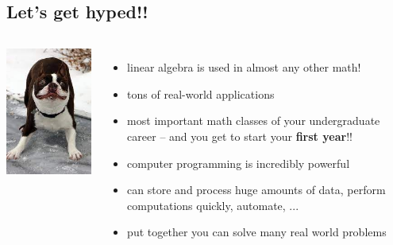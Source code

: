 \documentclass[handout]{beamer}
\begin{document}
\subsection{Let's get hyped!!}
\begin{frame}{}
 \begin{columns}
    \centering
             \includegraphics[width=\linewidth]{img/hype.jpg}
    \begin{itemize}
      \item linear algebra is used in almost any other math!
      \item tons of real-world applications
      \item most important math classes of your undergraduate career -- and you get to start your \textbf{first year}!!
      \item computer programming is incredibly powerful
      \item can store and process huge amounts of data, perform computations quickly, automate, ...
      \item put together you can solve many real world problems
    \end{itemize}
 \end{columns} 
\end{frame}
\end{document}
